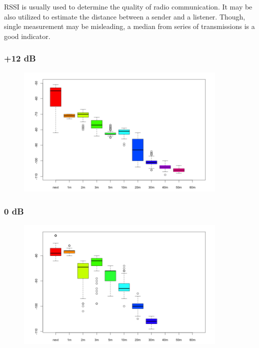 RSSI is usually used to determine the quality of radio communication.
It may be also utilized to estimate the distance between a sender and a listener.
Though, single measurement may be misleading, a median from series of transmissions is a good indicator.


\subsubsection{+12 dB}

\begin{figure}[H]
  \centering
  \includegraphics[width=0.9\textwidth]{img/tests/rssi/db_12.png}
\end{figure}


\subsubsection{0 dB}

\begin{figure}[H]
  \centering
  \includegraphics[width=0.9\textwidth]{img/tests/rssi/db_00.png}
\end{figure}


